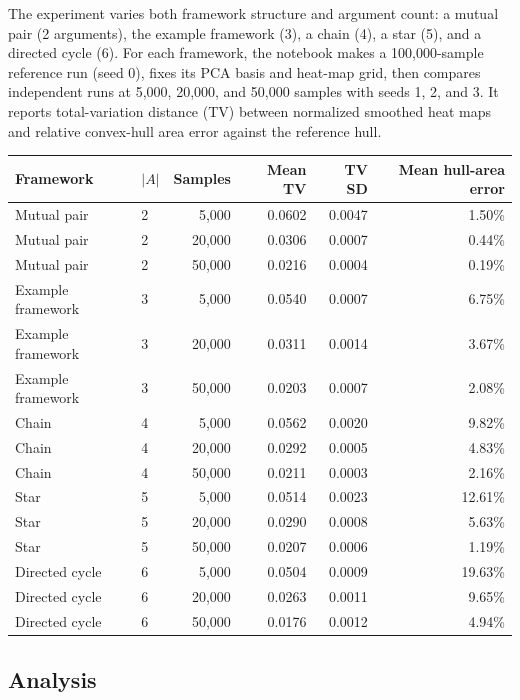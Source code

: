 \documentclass[11pt,a4paper]{article}
\begin{document}
The experiment varies both framework structure and argument count: a mutual pair (2 arguments), the example framework (3), a chain (4), a star (5), and a directed cycle (6). For each framework, the notebook makes a 100,000-sample reference run (seed 0), fixes its PCA basis and heat-map grid, then compares independent runs at 5,000, 20,000, and 50,000 samples with seeds 1, 2, and 3. It reports total-variation distance (TV) between normalized smoothed heat maps and relative convex-hull area error against the reference hull.

\begin{center}
\scriptsize
\begin{tabular}{llrrrr}
\toprule
Framework & $|A|$ & Samples & Mean TV & TV SD & Mean hull-area error \\
\midrule
Mutual pair & 2 & 5,000 & 0.0602 & 0.0047 & 1.50\% \\
Mutual pair & 2 & 20,000 & 0.0306 & 0.0007 & 0.44\% \\
Mutual pair & 2 & 50,000 & 0.0216 & 0.0004 & 0.19\% \\
Example framework & 3 & 5,000 & 0.0540 & 0.0007 & 6.75\% \\
Example framework & 3 & 20,000 & 0.0311 & 0.0014 & 3.67\% \\
Example framework & 3 & 50,000 & 0.0203 & 0.0007 & 2.08\% \\
Chain & 4 & 5,000 & 0.0562 & 0.0020 & 9.82\% \\
Chain & 4 & 20,000 & 0.0292 & 0.0005 & 4.83\% \\
Chain & 4 & 50,000 & 0.0211 & 0.0003 & 2.16\% \\
Star & 5 & 5,000 & 0.0514 & 0.0023 & 12.61\% \\
Star & 5 & 20,000 & 0.0290 & 0.0008 & 5.63\% \\
Star & 5 & 50,000 & 0.0207 & 0.0006 & 1.19\% \\
Directed cycle & 6 & 5,000 & 0.0504 & 0.0009 & 19.63\% \\
Directed cycle & 6 & 20,000 & 0.0263 & 0.0011 & 9.65\% \\
Directed cycle & 6 & 50,000 & 0.0176 & 0.0012 & 4.94\% \\
\bottomrule
\end{tabular}
\end{center}

\subsection{Analysis}
\end{document}
